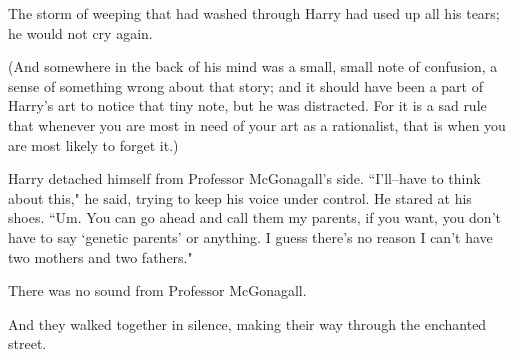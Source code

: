 The storm of weeping that had washed through Harry had used up all his tears; he would not cry again.

(And somewhere in the back of his mind was a small, small note of confusion, a sense of something wrong about that story; and it should have been a part of Harry's art to notice that tiny note, but he was distracted. For it is a sad rule that whenever you are most in need of your art as a rationalist, that is when you are most likely to forget it.)

Harry detached himself from Professor McGonagall's side. ``I'll\---have to think about this," he said, trying to keep his voice under control. He stared at his shoes. ``Um. You can go ahead and call them my parents, if you want, you don't have to say `genetic parents' or anything. I guess there's no reason I can't have two mothers and two fathers."

There was no sound from Professor McGonagall.

And they walked together in silence, making their way through the enchanted street.

